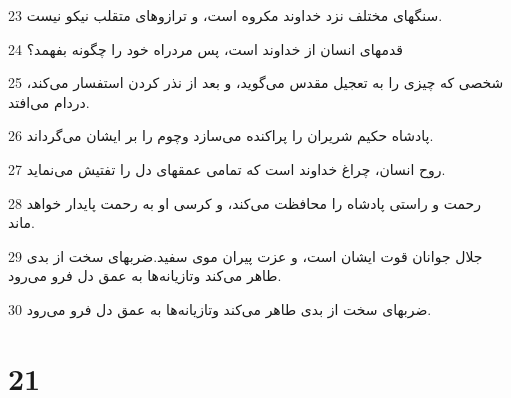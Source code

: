 \par 23 سنگهای مختلف نزد خداوند مکروه است، و ترازوهای متقلب نیکو نیست.
\par 24 قدمهای انسان از خداوند است، پس مردراه خود را چگونه بفهمد؟
\par 25 شخصی که چیزی را به تعجیل مقدس می‌گوید، و بعد از نذر کردن استفسار می‌کند، دردام می‌افتد.
\par 26 پادشاه حکیم شریران را پراکنده می‌سازد وچوم را بر ایشان می‌گرداند.
\par 27 روح انسان، چراغ خداوند است که تمامی عمقهای دل را تفتیش می‌نماید.
\par 28 رحمت و راستی پادشاه را محافظت می‌کند، و کرسی او به رحمت پایدار خواهد ماند.
\par 29 جلال جوانان قوت ایشان است، و عزت پیران موی سفید.ضربهای سخت از بدی طاهر می‌کند وتازیانه‌ها به عمق دل فرو می‌رود.
\par 30 ضربهای سخت از بدی طاهر می‌کند وتازیانه‌ها به عمق دل فرو می‌رود.
 
\chapter{21}

